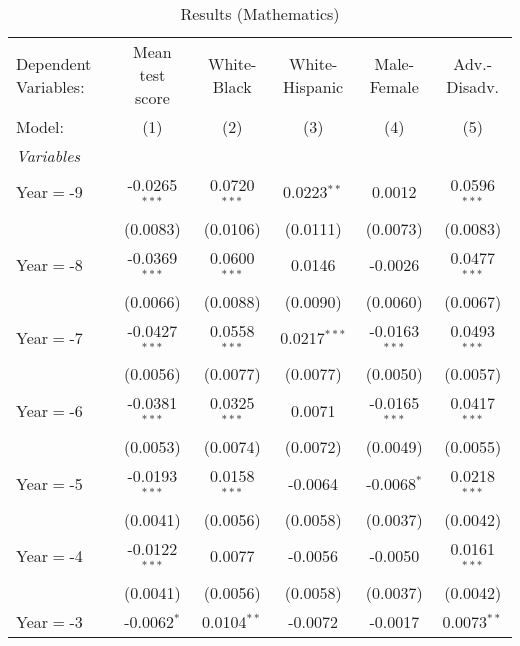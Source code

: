 
\begin{table}[htbp]
   \centering
   \caption{\label{MainResultsMath} Results (Mathematics)}
   \begin{tabular}{lccccc}
      \tabularnewline\midrule\midrule
      Dependent Variables: & Mean test score & White-Black     & White-Hispanic & Male-Female     & Adv.-Disadv.\\
      Model:               & (1)             & (2)             & (3)            & (4)             & (5)\\
      \midrule \emph{Variables} &   &   &   &   &  \\
      Year$=$-9            & -0.0265$^{***}$ & 0.0720$^{***}$  & 0.0223$^{**}$  & 0.0012          & 0.0596$^{***}$\\
                           & (0.0083)        & (0.0106)        & (0.0111)       & (0.0073)        & (0.0083)\\
      Year$=$-8            & -0.0369$^{***}$ & 0.0600$^{***}$  & 0.0146         & -0.0026         & 0.0477$^{***}$\\
                           & (0.0066)        & (0.0088)        & (0.0090)       & (0.0060)        & (0.0067)\\
      Year$=$-7            & -0.0427$^{***}$ & 0.0558$^{***}$  & 0.0217$^{***}$ & -0.0163$^{***}$ & 0.0493$^{***}$\\
                           & (0.0056)        & (0.0077)        & (0.0077)       & (0.0050)        & (0.0057)\\
      Year$=$-6            & -0.0381$^{***}$ & 0.0325$^{***}$  & 0.0071         & -0.0165$^{***}$ & 0.0417$^{***}$\\
                           & (0.0053)        & (0.0074)        & (0.0072)       & (0.0049)        & (0.0055)\\
      Year$=$-5            & -0.0193$^{***}$ & 0.0158$^{***}$  & -0.0064        & -0.0068$^{*}$   & 0.0218$^{***}$\\
                           & (0.0041)        & (0.0056)        & (0.0058)       & (0.0037)        & (0.0042)\\
      Year$=$-4            & -0.0122$^{***}$ & 0.0077          & -0.0056        & -0.0050         & 0.0161$^{***}$\\
                           & (0.0041)        & (0.0056)        & (0.0058)       & (0.0037)        & (0.0042)\\
      Year$=$-3            & -0.0062$^{*}$   & 0.0104$^{**}$   & -0.0072        & -0.0017         & 0.0073$^{**}$\\

\end{tabular}
\end{table}
